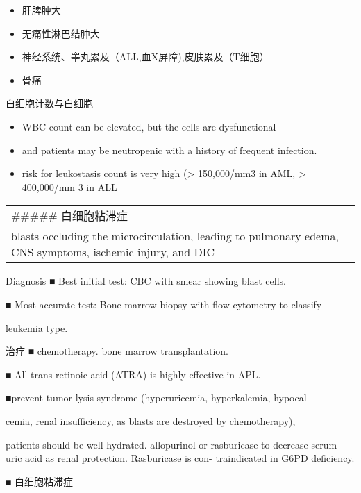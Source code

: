 \documentclass[
  ignorenonframetext,
]{beamer}
\begin{document}
\begin{frame}
\begin{itemize}
\item
  肝脾肿大
\item
  无痛性淋巴结肿大
\item
  神经系统、睾丸累及（ALL,血X屏障),皮肤累及（T细胞）
\item
  骨痛
\end{itemize}
\end{frame}

\begin{frame}
\begin{block}{白细胞计数与白细胞}
\protect\hypertarget{ux767dux7ec6ux80deux8ba1ux6570ux4e0eux767dux7ec6ux80de}{}
\begin{itemize}
\item
  WBC count can be elevated, but the cells are dysfunctional
\item
  and patients may be neutropenic with a history of frequent infection.
\item
  risk for leukostasis count is very high (\textgreater{} 150,000/mm3 in
  AML, \textgreater{} 400,000/mm 3 in ALL
\end{itemize}

\begin{longtable}[]{@{}
  >{\raggedright\arraybackslash}p{}@{}}
\toprule()
\endhead
\#\#\#\#\# 白细胞粘滞症 \\
blasts occluding the microcirculation, leading to pulmonary edema, CNS
symptoms, ischemic injury, and DIC \\
\bottomrule()
\end{longtable}
\end{block}

\begin{block}{Diagnosis}
\protect\hypertarget{diagnosis}{}
■ Best initial test: CBC with smear showing blast cells.

■ Most accurate test: Bone marrow biopsy with flow cytometry to classify

leukemia type.
\end{block}
\end{frame}

\begin{frame}
\begin{block}{治疗}
\protect\hypertarget{ux6cbbux7597}{}
■ chemotherapy. bone marrow transplantation.

■ All-trans-retinoic acid (ATRA) is highly effective in APL.

■prevent tumor lysis syndrome (hyperuricemia, hyperkalemia, hypocal-

cemia, renal insufficiency, as blasts are destroyed by chemotherapy),

patients should be well hydrated. allopurinol or rasburicase to decrease
serum uric acid as renal protection. Rasburicase is con- traindicated in
G6PD deficiency.

■ 白细胞粘滞症
\end{block}
\end{frame}
\end{document}
